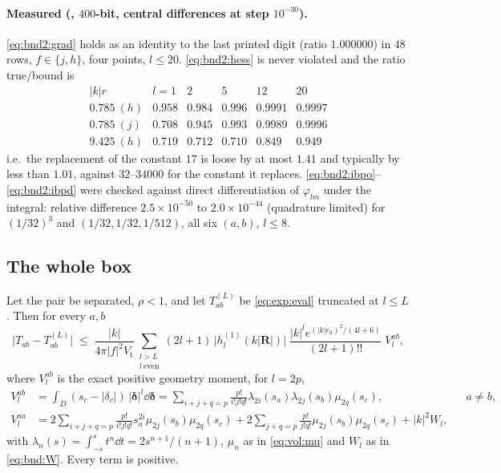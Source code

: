 \paragraph{Measured (, $400$-bit, central differences at step $10^{-30}$).}
\eqref{eq:bnd2:grad} holds as an identity to the last printed digit (ratio
$1.000000$) in $48$ rows, $f \in \{j,h\}$, four points, $l \le 20$.
\eqref{eq:bnd2:hess} is never violated and the ratio true$/$bound is
\[
\begin{array}{lccccc}
|k|r & l=1 & 2 & 5 & 12 & 20\\
0.785\ (h) & 0.958 & 0.984 & 0.996 & 0.9991 & 0.9997\\
0.785\ (j) & 0.708 & 0.945 & 0.993 & 0.9989 & 0.9996\\
9.425\ (h) & 0.719 & 0.712 & 0.710 & 0.849 & 0.949
\end{array}
\]
i.e.\ the replacement of the constant $17$ is loose by at most $1.41$ and typically by less
than $1.01$, against $32$--$34000$ for the constant it replaces.
\eqref{eq:bnd2:ibpo}--\eqref{eq:bnd2:ibpd} were checked against direct differentiation of
$\varphi_{lm}$ under the integral: relative difference $2.5\times10^{-50}$ to
$2.0\times10^{-44}$ (quadrature limited) for $(1/32)^3$ and $(1/32,1/32,1/512)$, all six
$(a,b)$, $l \le 8$.

\subsection{The whole box}
\label{sec:bnd2:whl}

\begin{theorem}
\label{thm:bnd2:reg}
Let the pair be separated, $\rho < 1$, and let $T^{(L)}_{ab}$ be \eqref{eq:exp:eval}
truncated at $l \le L$. Then for every $a,b$
\begin{equation}
\bigl|T_{ab}-T^{(L)}_{ab}\bigr| \;\le\;
\frac{|k|}{4\pi|f|^{2}V_{\mathrm{t}}}
\sum_{\substack{l>L\\ l\ \mathrm{even}}} (2l+1)\,
\bigl|h^{(1)}_l(k|\mathbf{R}|)\bigr|\;
\frac{|k|^{l}e^{(|k|r_{\mathrm{d}})^{2}/(4l+6)}}{(2l+1)!!}\;V^{ab}_l ,
\label{eq:bnd2:reg}
\end{equation}
where $V^{ab}_l$ is the exact positive geometry moment, for $l = 2p$,
\begin{align}
V^{ab}_l &= \int_D (s_c-|\delta_c|)\,|\boldsymbol{\delta}|^{l}\dd\boldsymbol{\delta}
= \sum_{i+j+q=p}\tfrac{p!}{i!j!q!}\lambda_{2i}(s_a)\lambda_{2j}(s_b)\mu_{2q}(s_c),
&& a\neq b,
\label{eq:bnd2:Vo}\\
V^{aa}_l &= 2\!\!\sum_{i+j+q=p}\!\!\tfrac{p!}{i!j!q!}s_a^{2i}\mu_{2j}(s_b)\mu_{2q}(s_c)
+ 2\!\sum_{j+q=p}\!\tfrac{p!}{j!q!}\mu_{2j}(s_b)\mu_{2q}(s_c) + |k|^2 W_l ,
\label{eq:bnd2:Vd}
\end{align}
with $\lambda_n(s) = \int_{-s}^{s}t^n\dd t = 2s^{n+1}/(n+1)$, $\mu_n$ as in
\eqref{eq:vol:mu} and $W_l$ as in \eqref{eq:bnd:W}. Every term is positive.
\end{theorem}

